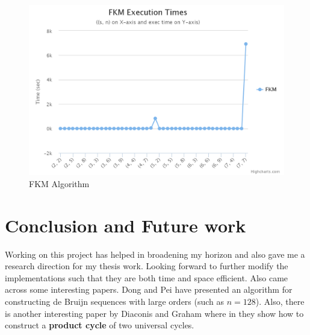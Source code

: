 \documentclass[12pt,twoside]{article}
\begin{document}
\begin{figure}
  \centering
    \includegraphics[width=6in]{fkm.png}
  \caption{FKM Algorithm}
  \label{fig:fkm}
\end{figure}
\hfill \break

\section{Conclusion and Future work}
Working on this project has helped in broadening my horizon and also gave me a research direction for my thesis work. Looking forward to further modify the implementations such that they are both time and space efficient. Also came across some interesting papers. Dong and Pei \cite{Dong} have presented an algorithm for constructing de Bruijn sequences with large orders (such as $n = 128$). Also, there is another interesting paper by Diaconis and Graham \cite{Graham} where in they show how to construct a \textbf{product cycle} of two universal cycles.
\end{document}
